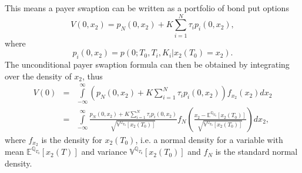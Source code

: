 \documentclass[11pt,a4paper]{article}
\numberwithin{equation}{section}
\begin{document}
This means a payer swaption can be written as a portfolio of bond put options
\begin{equation*}
  V(0,{x_2}) = {p_N}(0,{x_2}) + K\sum\limits_{i = 1}^N {{\tau _i}{p_i}(0,{x_2})},
\end{equation*}
where
\begin{equation*}
  {p_i}(0,{x_2}) = p(0;{T_0},{T_i},{K_i}|{x_2}(T_0) = {x_2}).
\end{equation*}
The unconditional payer swaption formula can then be obtained by integrating over the density of $x_2$, thus
\begin{eqnarray*}
V(0) &=& \int\limits_{ - \infty }^\infty  {\left( {{p_N}(0,{x_2}) + K\sum\limits_{i = 1}^N {{\tau _i}{p_i}(0,{x_2})} } \right){f_{{x_2}}}({x_2})d{x_2}} \nonumber \\
 &=& \int\limits_{ - \infty }^\infty  {\frac{{{p_N}(0,{x_2}) + K\sum\limits_{i = 1}^N {{\tau _i}{p_i}(0,{x_2})} }}{{\sqrt {{\mathbb{V}^{{\mathbb{Q}_{T_0}}}}[{x_2}(T_0)]} }}{f_N}\left( {\frac{{{x_2} - {\mathbb{E}^{{\mathbb{Q}_{T_0}}}}[{x_2}(T_0)]}}{{\sqrt {{\mathbb{V}^{{\mathbb{Q}_{T_0}}}}[{x_2}(T_0)]} }}} \right)d{x_2}},
\end{eqnarray*}
where $f_{x_2}$ is the density for $x_2(T_0)$, i.e. a normal density for a variable with mean ${{\mathbb{E}^{{\mathbb{Q}_{T_0}}}}[{x_2}(T)]}$ and variance $\mathbb{V}{^{{\mathbb{Q}_{T_0}}}[{x_2}(T_0)]}$ and $f_N$ is the standard normal density.








\newpage
\end{document}
